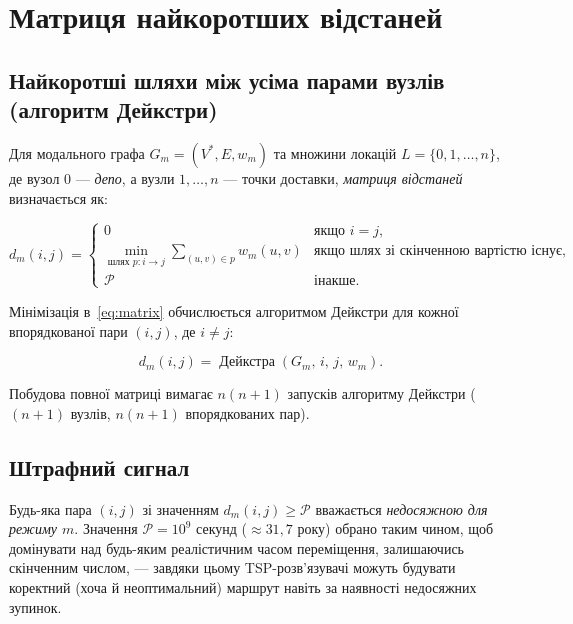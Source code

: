 \documentclass[12pt, a4paper]{article}
\theoremstyle{definition}
\begin{document}
\section{Матриця найкоротших відстаней}

\subsection{Найкоротші шляхи між усіма парами вузлів (алгоритм Дейкстри)}

Для модального графа $G_m = (V^*, E, w_m)$ та множини локацій
$L = \{0, 1, \ldots, n\}$, де вузол $0$ --- \emph{депо}, а вузли
$1, \ldots, n$ --- точки доставки, \emph{матриця відстаней} визначається як:

\begin{equation}
  \label{eq:matrix}
  d_m(i, j) =
  \begin{cases}
    0 & \text{якщо } i = j, \\
    \displaystyle\min_{\text{шлях } p: i \to j}
      \sum_{(u,v) \in p} w_m(u,v)
      & \text{якщо шлях зі скінченною вартістю існує,} \\
    \mathcal{P} & \text{інакше.}
  \end{cases}
\end{equation}

Мінімізація в~\eqref{eq:matrix} обчислюється алгоритмом Дейкстри для кожної
впорядкованої пари $(i, j)$, де $i \neq j$:

\[
  d_m(i, j) = \operatorname{Дейкстра}(G_m,\, i,\, j,\, w_m).
\]

Побудова повної матриці вимагає $n(n+1)$ запусків алгоритму Дейкстри
($(n+1)$ вузлів, $n(n+1)$ впорядкованих пар).

\subsection{Штрафний сигнал}

Будь-яка пара $(i, j)$ зі значенням $d_m(i, j) \geq \mathcal{P}$
вважається \emph{недосяжною для режиму $m$}. Значення $\mathcal{P} = 10^9$
секунд ($\approx 31{,}7$ року) обрано таким чином, щоб домінувати над будь-яким
реалістичним часом переміщення, залишаючись скінченним числом, --- завдяки
цьому TSP-розв'язувачі можуть будувати коректний (хоча й неоптимальний)
маршрут навіть за наявності недосяжних зупинок.
\end{document}
